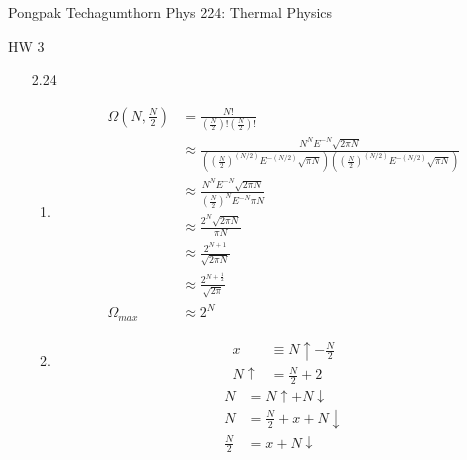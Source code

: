 \documentclass{article}
\begin{document}
\large
{\Large Pongpak Techagumthorn
\hfill Phys 224: Thermal Physics}
\begin{center}
    {\Large
        HW 3
    }
    \end{center}
\vspace{0.1in}
\begin{enumerate}
    \item [2.24]
        \begin{enumerate}
            \item
            \begin{align*}
                \Omega \left( N,\frac{N}{2} \right) &= \frac{N!}{\left( \frac{N}{2} \right)!\left( \frac{N}{2} \right)!} \\
                &\approx \frac{N^N E^{-N} \sqrt{2 \pi N}}{\left( \left( \frac{N}{2} \right)^{(N/2)} E^{-(N/2)} \sqrt{\pi N} \right)\left( \left( \frac{N}{2} \right)^{(N/2)} E^{-(N/2)} \sqrt{\pi N} \right)} \\
                &\approx \frac{N^N E^{-N} \sqrt{2 \pi N}}{\left( \frac{N}{2} \right)^N E^{-N} \pi N} \\
                &\approx \frac{2^N \sqrt{2 \pi N}}{\pi N} \\
                &\approx \frac{2^{N + 1}}{\sqrt{2 \pi N}} \\
                &\approx \frac{2^{N + \frac{1}{2}}}{\sqrt{2 \pi}} \\
                \Omega_{max} &\approx 2^N
            \end{align*}
            \vspace{0.05in}
            \item 
            \begin{align*}
                x &\equiv N \uparrow - \frac{N}{2} \\
                N \uparrow &= \frac{N}{2} + 2
            \end{align*}
            \begin{align*}
                N &= N \uparrow + N \downarrow \\
                N &= \frac{N}{2} + x + N \downarrow \\
                \frac{N}{2} &= x + N \downarrow \\

\end{align*}
\end{enumerate}
\end{enumerate}
\end{document}
